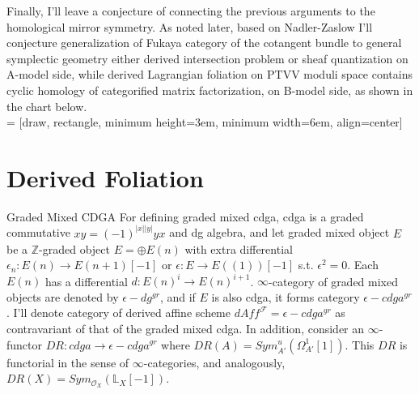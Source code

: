 \documentclass{article}
\begin{document}
\noindent
Finally, I'll leave a conjecture of connecting the previous arguments to the homological mirror symmetry. 
As noted later, based on Nadler-Zaslow I'll conjecture generalization of Fukaya category of the cotangent bundle
to general symplectic geometry either derived intersection problem or sheaf quantization on A-model side, 
while derived Lagrangian foliation on PTVV moduli space contains cyclic homology of categorified matrix factorization, on B-model side,
as shown in the chart below. \\


\vspace{1cm}
 = [draw, rectangle, minimum height=3em, minimum width=6em, align=center]
\vspace{1cm}









\tableofcontents
\vspace{1cm}






\section {Derived Foliation}


\begin{definition}{Graded Mixed CDGA}{}
For defining graded mixed cdga, cdga is a graded commutative $xy = (-1)^{|x||y|}yx$ and dg algebra,
and let graded mixed object $E$ be a $\mathbb{Z}$-graded object $E=\oplus E(n)$ with extra differential $\epsilon_n: E(n)\to E(n+1)[-1]$
or $\epsilon: E\to E((1))[-1]$ s.t. $\epsilon^2=0$. Each $E(n)$ has a differential $d:E(n)^i\to E(n)^{i+1}$.
$\infty$-category of graded mixed objects are denoted by $\epsilon-dg^{gr}$,
and if $E$ is also cdga, it forms category $\epsilon-cdga^{gr}$. I'll denote category of derived affine scheme 
$dAff^{\mathcal{F}} = \epsilon-cdga^{gr}$ as contravariant of that of the graded mixed cdga. 
In addition, consider an $\infty$-functor $DR: cdga \to \epsilon-cdga^{gr}$ where $DR(A) = Sym_{A'}^u (\Omega_{A'}^1[1])$.
This $DR$ is functorial in the sense of $\infty$-categories, and analogously, $DR(X) = Sym_{\mathcal{O}_X}(\mathbb{L}_X [-1])$.
\end{definition}
\end{document}
